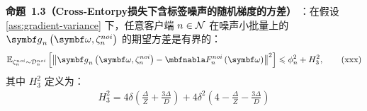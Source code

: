 \section{}\label{app:pro3}
\noindent \textbf{命题~1.3（Cross-Entorpy损失下含标签噪声的随机梯度的方差）}
：在假设 \ref{ass:gradient-variance} 下，任意客户端 $n\in\mathcal{N}$ 在噪声小批量上的 $\gb_n\left(\omegab,\zetanoi_n\right)$ 的期望方差是有界的：
\begin{equation}\label{bounded-variance with noise}
     \mathbb{E}_{\zetanoi_n\sim \Dnoi_n}\left[\left\Vert \gb_n\left(\boldsymbol{\omega},\zetanoi_n\right) - \nabla \fnoi_n\left(\boldsymbol{\omega}\right) \right\Vert^2 \right] \leq \phi_n^2+H_3^2,
     \tag{xxx}
    \end{equation}
其中 $H_3^2$ 定义为：
\begin{align}\label{eq:H}
    H_3^2 =4\delta\left(\frac{\Delta}{Z}+\frac{3\Delta}{D}\right)+4\delta^2\left(4-\frac{\Delta}{Z}-\frac{3\Delta}{D}\right) 
    \tag{xxx}
\end{align}

